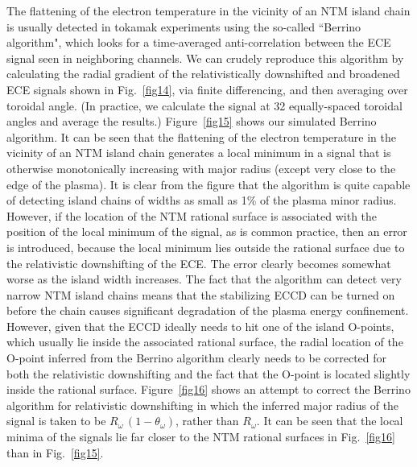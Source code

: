 \documentclass[12pt,prb,aps]{revtex4-1}
\begin{document}
The flattening of the electron temperature in the vicinity of an NTM island chain is usually detected in tokamak experiments using the so-called ``Berrino algorithm", which looks for
a time-averaged anti-correlation between the ECE signal seen in neighboring channels.\cite{ece4}  We can crudely reproduce this algorithm  by calculating the radial gradient of
the relativistically downshifted and broadened ECE signals shown in Fig.~\ref{fig14}, via finite differencing,  and then averaging over toroidal angle. (In practice, we
calculate the signal at 32 equally-spaced toroidal angles and average the results.) Figure~\ref{fig15} shows our simulated Berrino algorithm. It can be seen that the
flattening of the electron temperature in the vicinity of an NTM island chain generates a local minimum in a signal that is otherwise monotonically increasing with major radius (except very close to
the edge of the plasma). It is clear from the figure that the algorithm is quite capable of detecting island chains of widths as small as 1\% of the plasma minor radius. 
However, if the location of the NTM rational surface is associated with the position of the local minimum of the signal, as is common practice,\cite{ece4}  then an error is introduced, because the
local minimum lies outside the rational surface due to the relativistic downshifting of the ECE.  The error clearly becomes somewhat worse as the island width
increases. The fact that the algorithm can detect very narrow NTM island chains means that the stabilizing ECCD can be turned on before the chain causes significant
degradation of the plasma energy confinement. However, given that the ECCD ideally needs to hit one of the island O-points, which usually lie inside the associated rational 
surface, the radial location of the O-point inferred from the Berrino algorithm clearly needs to be corrected for both the relativistic downshifting and the fact that the O-point
is located slightly inside the rational surface. Figure~\ref{fig16} shows an attempt to correct the Berrino algorithm for relativistic downshifting in which the inferred major
radius of the signal is taken to be $R_\omega\,(1-\theta_\omega)$, rather than $R_\omega$. It can be seen that the local minima of the signals lie far closer to
the NTM rational surfaces in Fig.~\ref{fig16} than in Fig.~\ref{fig15}. 
\fi
 
\end{document}

